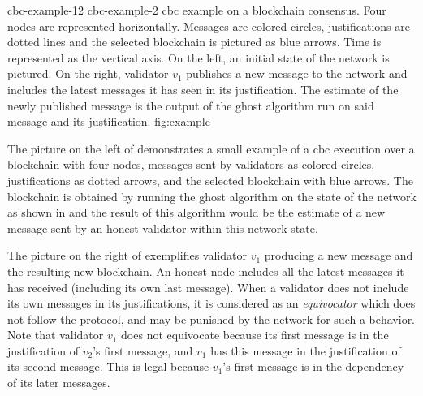 \doublefigure
    {cbc-example-12}
    {cbc-example-2}
    {\gls{cbc} example on a blockchain consensus.%
    Four nodes are represented horizontally. Messages are colored circles,
    justifications are dotted lines and the selected blockchain is pictured as
    blue arrows. Time is represented as the vertical axis.%
    On the left, an initial state of the network is pictured. %
    On the right, validator \(v_1\) publishes a new message to the network and
    includes the latest messages it has seen in its justification. The estimate
    of the newly published message is the output of the \gls{ghost} algorithm
    run on said message and its justification.
    }
    {fig:example}

The picture on the left of  demonstrates a small example of a
\gls{cbc} execution over a blockchain with four nodes, messages sent by
validators as colored circles, justifications as dotted arrows, and the selected
blockchain with blue arrows.  The blockchain is obtained by running the
\gls{ghost} algorithm on the state of the network as shown in 
and the result of this algorithm would be the estimate of a new message sent by
an honest validator within this network state.

The picture on the right of  exemplifies validator \(v_1\)
producing a new message and the resulting new blockchain. An honest node
includes all the latest messages it has received (including its own last
message).  When a validator does not include its own messages in its
justifications, it is considered as an \textit{equivocator} which does not
follow the protocol, and may be punished by the network for such a behavior.
Note that validator \(v_1\) does not equivocate because its first message is in
the justification of \(v_2\)'s first message, and \(v_1\) has this message in
the justification of its second message. This is legal because \(v_1\)'s first
message is in the dependency of its later messages.

